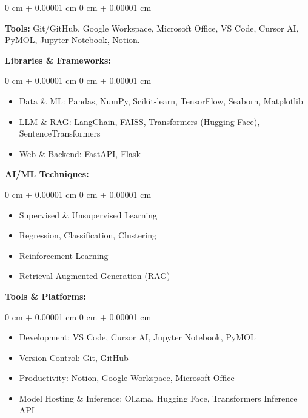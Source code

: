 \documentclass[10pt, letterpaper]{article}
\newenvironment{highlights}{
    \begin{itemize}[
        topsep=0.10 cm,
        parsep=0.10 cm,
        partopsep=0pt,
        itemsep=0pt,
        leftmargin=0 cm + 10pt
    ]
}{
    \end{itemize}
} %
\newenvironment{onecolentry}{
    \begin{adjustwidth}{
        0 cm + 0.00001 cm
    }{
        0 cm + 0.00001 cm
    }
}{
    \end{adjustwidth}
} %
\begin{document}
        \begin{onecolentry}
        \textbf{Tools:} Git/GitHub, Google Workspace, Microsoft Office, VS Code, Cursor AI, PyMOL, Jupyter Notebook, Notion. \end{onecolentry}

        \vspace{0.2 cm}
        
        \textbf{Libraries \& Frameworks:}
        \vspace{0.10 cm}
        \begin{onecolentry}
            \begin{highlights}
                \item Data \& ML: Pandas, NumPy, Scikit-learn, TensorFlow, Seaborn, Matplotlib
                \item LLM \& RAG: LangChain, FAISS, Transformers (Hugging Face), SentenceTransformers
                \item Web \& Backend: FastAPI, Flask
            \end{highlights}
            \end{onecolentry}

        \vspace{0.2 cm}

        \textbf{AI/ML Techniques:}
        \vspace{0.10 cm}
        \begin{onecolentry}
            \begin{highlights}
                \item Supervised \& Unsupervised Learning
                \item Regression, Classification, Clustering
                \item Reinforcement Learning
                \item Retrieval-Augmented Generation (RAG)
            \end{highlights}
        \end{onecolentry}
        
        \vspace{0.2 cm}

        \textbf{Tools \& Platforms:}
        \vspace{0.10 cm}
        \begin{onecolentry}
            \begin{highlights}
                \item Development: VS Code, Cursor AI, Jupyter Notebook, PyMOL
                \item Version Control: Git, GitHub
                \item Productivity: Notion, Google Workspace, Microsoft Office
                \item Model Hosting \& Inference: Ollama, Hugging Face, Transformers Inference API
                \end{highlights}
        \end{onecolentry}
\end{document}
